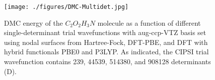 \begin{figure}
\begin{center}
\texttt{[image: ./figures/DMC-Multidet.jpg]}
\end{center}
\caption{DMC energy of the $C_2O_2H_3N$ molecule as a function of different single-determinant trial wavefunctions with aug-ccp-VTZ basis set using nodal surfaces from Hartree-Fock, DFT-PBE, and DFT with hybrid functionals PBE0 and P3LYP. As indicated, the CIPSI trial wavefunction contains 239, 44539, 514380, and 908128 determinants (D). }
\protect{\label{fig:CIPSI-DMC}}

\end{figure}
